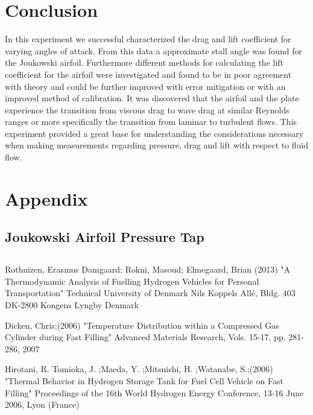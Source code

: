 \documentclass[paper=a4, fontsize=11pt, abstract=on]{scrartcl}
\numberwithin{equation}{section}		%
\numberwithin{figure}{section}			%
\numberwithin{table}{section}				%
\begin{document}
\section{Conclusion}
In this experiment we successful characterized the drag and lift coefficient for varying angles of attack. From this data a approximate stall angle was found for the Joukowski airfoil. Furthermore different methods for calculating the lift coefficient for the airfoil were investigated and found to be in poor agreement with theory and could be further improved with error mitigation or with an improved method of calibration. It was discovered that the airfoil and the plate experience the transition from viscous drag to wave drag at similar Reynolds ranges or more specifically the transition from laminar to turbulent flows. This experiment provided a great base for understanding the considerations necessary when making measurements regarding pressure, drag and lift with respect to fluid flow.





\newpage



\appendix
\section{Appendix} \label{App:Appendix}
\subsection{Joukowski Airfoil Pressure Tap}



\subsection{}




\begin{thebibliography}{99} %
 Rothuizen, Erasmus Damgaard; Rokni, Masoud; Elmegaard, Brian (2013)
\newblock "A Thermodynamic Analysis of Fuelling Hydrogen Vehicles for Personal Transportation" Technical University of Denmark
\newblock Nils Koppels Allé, Bldg. 403 DK-2800 Kongens Lyngby Denmark


 Dicken, Chris;(2006)
\newblock "Temperature Distribution within a Compressed Gas Cylinder during Fast Filling"
\newblock  Advanced Materials Research, Vols. 15-17, pp. 281-286, 2007 


 Hirotani, R.
Tomioka, J. ;Maeda, Y. ;Mitsuishi, H. ;Watanabe, S.;(2006)
\newblock "Thermal Behavior in Hydrogen Storage Tank for Fuel Cell Vehicle on Fast Filling"
\newblock  Proceedings of the 16th World Hydrogen Energy Conference, 13-16 June 2006, Lyon (France)


\end{thebibliography}


\end{document}
